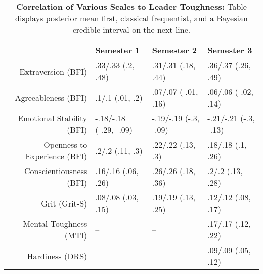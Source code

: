 \begin{table}[ht]
\centering
\begin{tabular}{rlll}
  \hline
 & Semester 1 & Semester 2 & Semester 3 \\ 
  \hline
Extraversion (BFI) & .33/.33 (.2, .48) & .31/.31 (.18, .44) & .36/.37 (.26, .49) \\ 
  Agreeableness (BFI) & .1/.1 (.01, .2) & .07/.07 (-.01, .16) & .06/.06 (-.02, .14) \\ 
  Emotional Stability (BFI) & -.18/-.18 (-.29, -.09) & -.19/-.19 (-.3, -.09) & -.21/-.21 (-.3, -.13) \\ 
  Openness to Experience (BFI) & .2/.2 (.11, .3) & .22/.22 (.13, .3) & .18/.18 (.1, .26) \\ 
  Conscientiousness (BFI) & .16/.16 (.06, .26) & .26/.26 (.18, .36) & .2/.2 (.13, .28) \\ 
  Grit (Grit-S) & .08/.08 (.03, .15) & .19/.19 (.13, .25) & .12/.12 (.08, .17) \\ 
  Mental Toughness (MTI) & -- & -- & .17/.17 (.12, .22) \\ 
  Hardiness (DRS) & -- & -- & .09/.09 (.05, .12) \\ 
   \hline
\end{tabular}
\caption{\textbf{Correlation of Various Scales to Leader Toughness:} Table displays posterior mean first, classical frequentist, and a Bayesian credible interval on the next line.} 
\label{tab:pers_corr}
\end{table}
